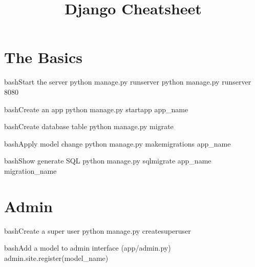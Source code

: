 \documentclass[10pt,a4paper]{article}
\title{\color{w3schools}Django Cheatsheet
}
\begin{document}
\maketitle

\small
\begin{multicols}{3}

\thispagestyle{empty}
\scriptsize



{\centering\section{The Basics}}

\begin{codebox}{bash}{Start the server}
python manage.py runserver
python manage.py runserver 8080

\end{codebox}

\begin{codebox}{bash}{Create an app}
python manage.py startapp app_name

\end{codebox}

\begin{codebox}{bash}{Create database table}
python manage.py migrate

\end{codebox}

\begin{codebox}{bash}{Apply model change}
python manage.py makemigrations app_name

\end{codebox}

\begin{codebox}{bash}{Show generate SQL}
python manage.py sqlmigrate app_name migration_name

\end{codebox}

{\centering\section{Admin}}

\begin{codebox}{bash}{Create a super user}
python manage.py createsuperuser

\end{codebox}

\begin{codebox}{bash}{Add a model to admin interface (app/admin.py)}
admin.site.register(model_name)


\end{codebox}
\end{multicols}
\end{document}
